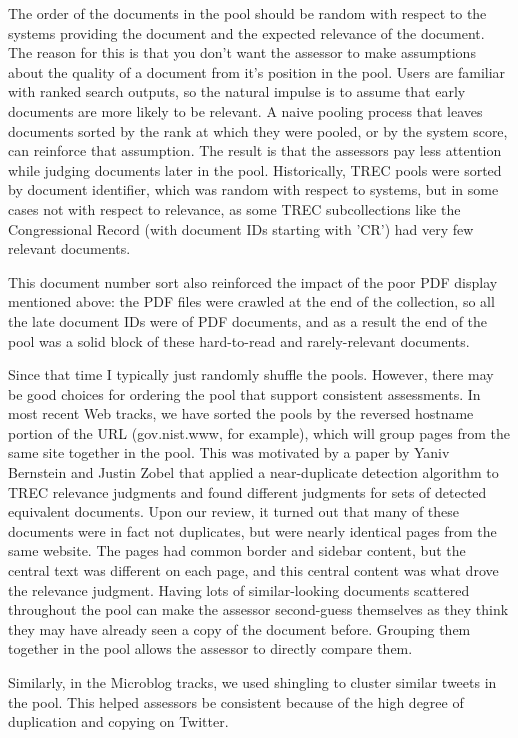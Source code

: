 \documentclass[nobib]{tufte-book}
\begin{document}
The order of the documents in the pool should be random with respect to the systems providing the document and the expected relevance of the document.  The reason for this is that you don't want the assessor to make assumptions about the quality of a document from it's position in the pool.  Users are familiar with ranked search outputs, so the natural impulse is to assume that early documents are more likely to be relevant.  A naive pooling process that leaves documents sorted by the rank at which they were pooled, or by the system score, can reinforce that assumption.  The result is that the assessors pay less attention while judging documents later in the pool.  Historically, TREC pools were sorted by document identifier, which was random with respect to systems, but in some cases not with respect to relevance, as some TREC subcollections like the Congressional Record (with document IDs starting with 'CR') had very few relevant documents.  

This document number sort also reinforced the impact of the poor PDF display mentioned above: the PDF files were crawled at the end of the collection, so all the late document IDs were of PDF documents, and as a result the end of the pool was a solid block of these hard-to-read and rarely-relevant documents.

Since that time I typically just randomly shuffle the pools.  However, there may be good choices for ordering the pool that support consistent assessments.  In most recent Web tracks, we have sorted the pools by the reversed hostname portion of the URL (gov.nist.www, for example), which will group pages from the same site together in the pool.  This was motivated by a paper by Yaniv Bernstein and Justin Zobel\autocite{bernstein_redundant_2005} that applied a near-duplicate detection algorithm to TREC relevance judgments and found different judgments for sets of detected equivalent documents.  Upon our review, it turned out that many of these documents were in fact not duplicates, but were nearly identical pages from the same website.  The pages had common border and sidebar content, but the central text was different on each page, and this central content was what drove the relevance judgment.  Having lots of similar-looking documents scattered throughout the pool can make the assessor second-guess themselves as they think they may have already seen a copy of the document before.  Grouping them together in the pool allows the assessor to directly compare them.

Similarly, in the Microblog tracks, we used shingling\autocite{broder_syntactic_1997} to cluster similar tweets in the pool.  This helped assessors be consistent because of the high degree of duplication and copying on Twitter.
\end{document}

